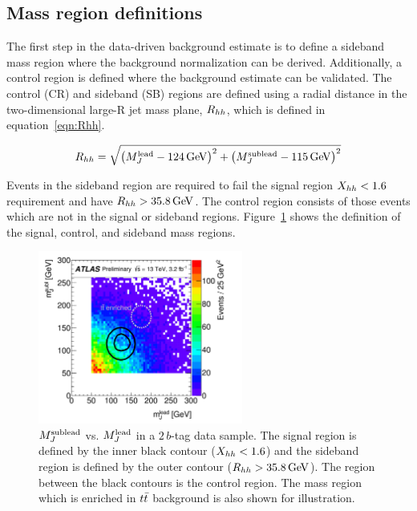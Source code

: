 \subsection{Mass region definitions}

The first step in the data-driven background estimate is to define a sideband mass region where the background normalization can be derived. Additionally, a control region is defined where the background estimate can be validated. The control (CR) and sideband (SB) regions are defined using a radial distance in the two-dimensional large-R jet mass plane, $R_{hh}$, which is defined in equation~\ref{eqn:Rhh}.

\begin{equation}
\label{eqn:Rhh}
\Rhh = \sqrt{\left(M_{J}^{\rm lead} - 124 \GeV\right)^2 + \left(M_{J}^{\rm sublead} - 115 \GeV\right)^2}
\end{equation}

Events in the sideband region are required to fail the signal region $X_{hh} < 1.6$ requirement and have $\Rhh > 35.8 \GeV$. The control region consists of those events which are not in the signal or sideband regions. Figure~\ref{fig:MassRegions} shows the definition of the signal, control, and sideband mass regions.

\begin{figure}[h!]
  \centering
  \captionsetup{justification=centering}

  \includegraphics[width=0.6\textwidth]{figures/MassRegions}
  \caption{$M_{J}^{\rm sublead}$ vs. $M_{J}^{\rm lead}$ in a $2\,b$-tag data sample. The signal region is defined by the inner black contour ($X_{hh} < 1.6$) and the sideband region is defined by the outer contour ($\Rhh > 35.8 \GeV$). The region between the black contours is the control region. The mass region which is enriched in $t\bar{t}$ background is also shown for illustration.~\cite{4bconf}}
  \label{fig:MassRegions}
\end{figure}


